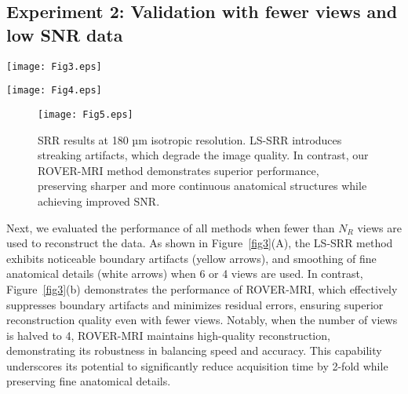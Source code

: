 \documentclass[AMA,STIX2COL]{MRM}
\begin{document}
\subsection{Experiment 2: Validation with fewer views and low SNR data}
%
\begin{figure*}[t]
\centerline{\texttt{[image: Fig3.eps]}}
\caption{Reconstruction results of our method and LS-SRR using fewer views. (A) LS-SRR reconstruction results, showing increased error as the view count decreases. (B) ROVER-MRI reconstruction results, demonstrating high-quality reconstruction even with fewer views. Rows 1 and 4 display typical reconstruction results, while Rows 2 and 5 show enlarged views of the regions within the red boxes. Rows 3 and 6 show the error maps for these regions, highlighting the superior reconstruction accuracy of ROVER-MRI compared to LS-SRR.}\label{fig3}
\end{figure*}
%
%
\begin{figure*}[t]
\centerline{\texttt{[image: Fig4.eps]}}
\caption{Reconstruction results of our method and LS-SRR with varying noise levels. (A) LS-SRR results under added noise, where reconstructions at SNR 30 show reduced error compared to SNR 15. (B) ROVER-MRI reconstructs cleaner images with significantly reduced errors compared to LS-SRR at both SNR levels. Rows 1 and 4 display typical reconstruction results, while Rows 2 and 5 show enlarged views of the regions within the red boxes. Rows 3 and 6 show the error maps for these regions, emphasizing the robustness of ROVER-MRI against noise.}\label{fig4}
\end{figure*}
%
%
\begin{figure}[t]
\centerline{\texttt{[image: Fig5.eps]}}
\caption{SRR results at 180 µm isotropic resolution. LS-SRR introduces streaking artifacts, which degrade the image quality. In contrast, our ROVER-MRI method demonstrates superior performance, preserving sharper and more continuous anatomical structures while achieving improved SNR. }\label{fig5}
\end{figure}
%
Next, we evaluated the performance of all methods when fewer than $N_R$ views are used to reconstruct the data. As shown in Figure~\ref{fig3}(A), the LS-SRR method exhibits noticeable boundary artifacts (yellow arrows), and smoothing of fine anatomical details (white arrows) when 6 or 4 views are used. In contrast, Figure~\ref{fig3}(b) demonstrates the performance of ROVER-MRI, which effectively suppresses boundary artifacts and minimizes residual errors, ensuring superior reconstruction quality even with fewer views. Notably, when the number of views is halved to 4, ROVER-MRI maintains high-quality reconstruction, demonstrating its robustness in balancing speed and accuracy. This capability underscores its potential to significantly reduce acquisition time by 2-fold while preserving fine anatomical details.
\end{document}
